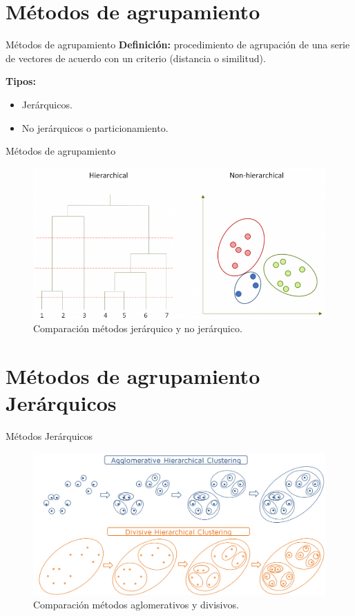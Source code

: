 \documentclass[spanish]{beamer}
\begin{document}
\section{Métodos de agrupamiento}
\begin{frame}{Métodos de agrupamiento}
  \textbf{Definición:} procedimiento de agrupación de una serie de vectores de acuerdo con un criterio (distancia o similitud).\break
  
\textbf{Tipos:}
	\begin{itemize}
		\item Jerárquicos.
		\item No jerárquicos o particionamiento.
	\end{itemize}
\end{frame}

\begin{frame}{Métodos de agrupamiento}
	
	\begin{figure}[H]
		\centering
		\includegraphics[scale=0.5]{victoria/compJerarquicoNoJerarquico}
		\caption{Comparación métodos jerárquico y no jerárquico.}
		\label{fig:ejemplo_metodos}
	\end{figure}

\end{frame}

\section{Métodos de agrupamiento\\ Jerárquicos}
\begin{frame}{Métodos Jerárquicos}
	\begin{figure}[H]
		\centering
		\includegraphics[scale=0.23]{victoria/compAglomeDivisivo}
		\caption{Comparación métodos aglomerativos y divisivos.}
		\label{fig:agl_div}
	\end{figure}
\end{frame}
\end{document}
